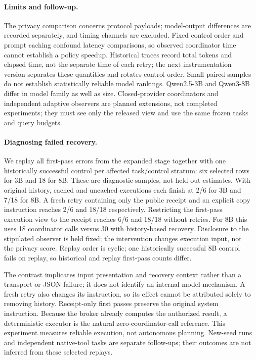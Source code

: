 

\paragraph{Limits and follow-up.}
The privacy comparison concerns protocol payloads; model-output differences are
recorded separately, and timing channels are excluded. Fixed control order and
prompt caching confound latency comparisons, so observed coordinator time cannot
establish a policy speedup. Historical traces record total tokens and elapsed time,
not the separate time of each retry; the next instrumentation version separates
these quantities and rotates control order. Small paired samples do not establish
statistically reliable model rankings. Qwen2.5-3B and Qwen3-8B differ in model family
as well as size. Closed-provider coordinators and independent adaptive observers
are planned extensions, not completed experiments; they must see only the released
view and use the same frozen tasks and query budgets.


\paragraph{Diagnosing failed recovery.}
We replay all first-pass errors from the expanded stage together with one
historically successful control per affected task/control stratum: six selected
rows for 3B and 18 for 8B. These are diagnostic samples, not held-out estimates.
With original history, cached and uncached executions each finish at 2/6 for 3B
and 7/18 for 8B. A fresh retry containing only the public receipt and an explicit
copy instruction reaches 2/6 and 18/18 respectively. Restricting the first-pass
execution view to the receipt reaches 6/6 and 18/18 without retries. For 8B this
uses 18 coordinator calls versus 30 with history-based recovery. Disclosure to
the stipulated observer is held fixed; the intervention changes execution input,
not the privacy score. Replay order is cyclic; one historically successful 8B
control fails on replay, so historical and replay first-pass counts differ.

The contrast implicates input presentation and recovery context rather than a
transport or JSON failure; it does not identify an internal model mechanism.
A fresh retry also changes its instruction, so its effect cannot be attributed
solely to removing history. Receipt-only first passes preserve the original
system instruction. Because the broker already computes the authorized result,
a deterministic executor is the natural zero-coordinator-call reference. This
experiment measures reliable execution, not autonomous planning. New-seed runs
and independent native-tool tasks are separate follow-ups; their outcomes are
not inferred from these selected replays.

